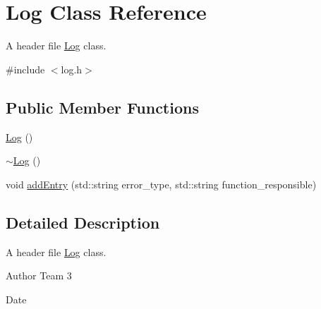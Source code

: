 \hypertarget{classLog}{\section{Log Class Reference}
\label{classLog}
}


A header file \hyperlink{classLog}{Log} class.  




{\ttfamily \#include $<$log.\-h$>$}

\subsection*{Public Member Functions}
\begin{DoxyCompactItemize}
\item 
\hyperlink{classLog_af6071a60aa52b6c1b511f99b4bc1b8fe}{Log} ()
\item 
\hyperlink{classLog_a0fbfda88fbee5027c89f6eb121059360}{$\sim$\-Log} ()
\item 
void \hyperlink{classLog_a1ccb79c34552336f3bd399b7c9b035d7}{add\-Entry} (std\-::string error\-\_\-type, std\-::string function\-\_\-responsible)
\end{DoxyCompactItemize}


\subsection{Detailed Description}
A header file \hyperlink{classLog}{Log} class. 

\begin{DoxyAuthor}{Author}
Team 3 
\end{DoxyAuthor}
\begin{DoxyDate}{Date}

\end{DoxyDate}


